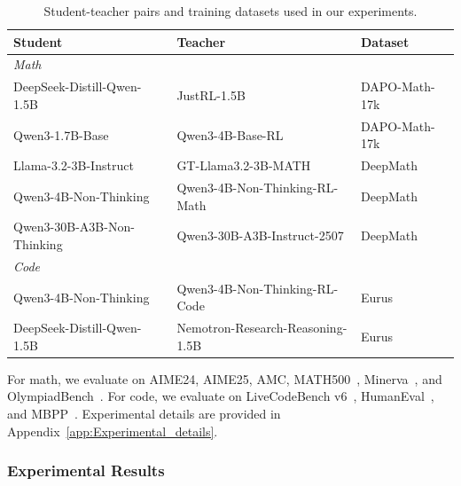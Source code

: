 \documentclass{article}
\theoremstyle{remark}
\begin{document}
\begin{table}[h]
\centering
\caption{Student-teacher pairs and training datasets used in our experiments.}
\label{tab:experiment_setup}
\begin{tabular}{lll}
\toprule
Student & Teacher & Dataset \\
\midrule
\multicolumn{3}{l}{\textit{Math}} \\
DeepSeek-Distill-Qwen-1.5B & JustRL-1.5B & DAPO-Math-17k \\
Qwen3-1.7B-Base & Qwen3-4B-Base-RL & DAPO-Math-17k \\
Llama-3.2-3B-Instruct & GT-Llama3.2-3B-MATH & DeepMath \\
Qwen3-4B-Non-Thinking & Qwen3-4B-Non-Thinking-RL-Math & DeepMath \\
Qwen3-30B-A3B-Non-Thinking & Qwen3-30B-A3B-Instruct-2507 & DeepMath \\
\midrule
\multicolumn{3}{l}{\textit{Code}} \\
Qwen3-4B-Non-Thinking & Qwen3-4B-Non-Thinking-RL-Code & Eurus \\
DeepSeek-Distill-Qwen-1.5B & Nemotron-Research-Reasoning-1.5B & Eurus \\
\bottomrule
\end{tabular}
\end{table}

For math, we evaluate on AIME24, AIME25, AMC, MATH500~\citep{lightman2023let}, Minerva~\citep{lewkowycz2022solving}, and OlympiadBench~\citep{he2024olympiadbench}. For code, we evaluate on LiveCodeBench v6~\citep{jain2025livecodebench}, HumanEval~\citep{chen2021evaluating}, and MBPP~\citep{austin2021program}. Experimental details are provided in Appendix~\ref{app:Experimental_details}.

\subsubsection{Experimental Results}
\end{document}
